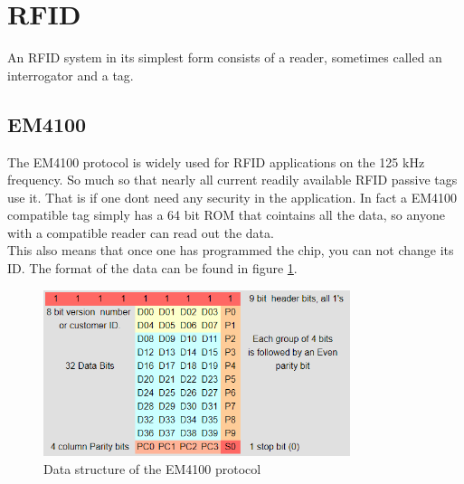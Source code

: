



\section{RFID}

An RFID system in its simplest form consists of a reader, sometimes called an interrogator and a tag. 


\subsection{EM4100}
The EM4100 protocol is widely used for RFID applications on the 125 kHz frequency. So much so that nearly all current readily available RFID passive tags use it. That is if one dont need any security in the application. In fact a EM4100 compatible tag simply has a 64 bit ROM that cointains all the data, so anyone with a compatible reader can read out the data. \cite{EM4100}\\

This also means that once one has programmed the chip, you can not change its ID. The format of the data can be found in figure \ref{fig:03:EM4100_structure}.

\begin{figure}[H]
    \centering
    \includegraphics[width=0.8\textwidth]{03_Theory/figures/Datta_layout.png}
    \caption{Data structure of the EM4100 protocol}
    \label{fig:03:EM4100_structure}
\end{figure}

